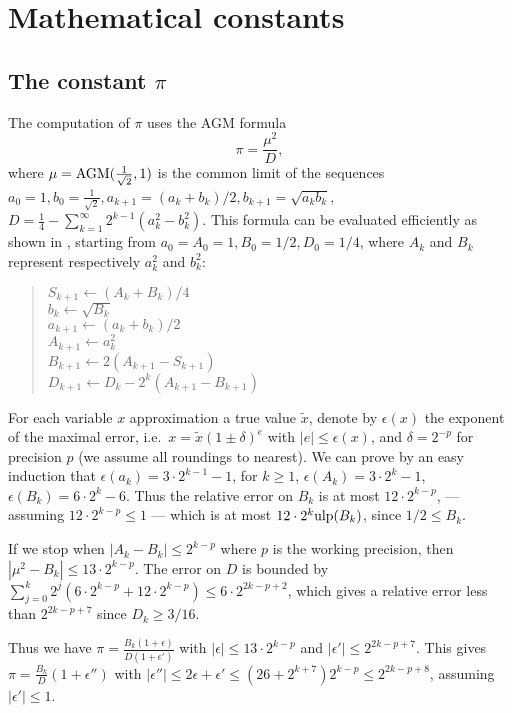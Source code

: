 \documentclass[12pt]{amsart}
\def\ulp{{\rm ulp}}
\begin{document}
\section{Mathematical constants}

\subsection{The constant $\pi$}

The computation of $\pi$ uses the AGM formula
\[ \pi = \frac{\mu^2}{D}, \]
where $\mu = {\rm AGM}(\frac{1}{\sqrt{2}}, 1)$ is the common limit
of the sequences $a_0=1, b_0 = \frac{1}{\sqrt{2}},
a_{k+1} = (a_k+b_k)/2, b_{k+1} = \sqrt{a_k b_k}$,
$D=\frac{1}{4} - \sum_{k=1}^{\infty} 2^{k-1} (a_k^2-b_k^2)$.
This formula can be evaluated efficiently as shown in \cite{ScGrVe94},
starting from $a_0 = A_0 = 1, B_0 = 1/2, D_0 = 1/4$, where $A_k$ and
$B_k$ represent respectively $a_k^2$ and $b_k^2$:
\begin{quote}
$S_{k+1} \leftarrow (A_k + B_k)/4$ \\
$b_k \leftarrow \sqrt{B_k}$ \\
$a_{k+1} \leftarrow (a_k + b_k)/2$ \\
$A_{k+1} \leftarrow a_k^2$ \\
$B_{k+1} \leftarrow 2 (A_{k+1} - S_{k+1})$ \\
$D_{k+1} \leftarrow D_k - 2^k (A_{k+1} - B_{k+1})$
\end{quote}
For each variable $x$ approximation a true value $\tilde{x}$,
denote by $\epsilon(x)$ the exponent of the maximal error,
i.e.\ $x = \tilde{x} (1\pm\delta)^e$ with $|e| \leq \epsilon(x)$,
and $\delta = 2^{-p}$ for precision $p$ (we assume all roundings to
nearest).
We can prove by an easy induction that $\epsilon(a_k) = 3 \cdot 2^{k-1} - 1$,
for $k \geq 1$, $\epsilon(A_k) = 3 \cdot 2^k - 1$,
$\epsilon(B_k) = 6 \cdot 2^k - 6$.
Thus the relative error on $B_k$ is at most $12 \cdot 2^{k-p}$,
--- assuming $12 \cdot 2^{k-p} \leq 1$ ---
which is at most $12 \cdot 2^k \ulp(B_k)$, since $1/2 \leq B_k$.

If we stop when $|A_k-B_k| \leq 2^{k-p}$ where $p$ is the working precision,
then $|\mu^2 - B_k| \leq 13 \cdot 2^{k-p}$.
The error on $D$ is bounded by $\sum_{j=0}^k 2^{j} (6 \cdot 2^{k-p} +
12 \cdot 2^{k-p}) \leq 6 \cdot 2^{2k-p+2}$, which gives a relative error less
than $2^{2k-p+7}$ since $D_k \geq 3/16$.

Thus we have $\pi = \frac{B_k (1+\epsilon)}{D (1+\epsilon')}$
with $|\epsilon| \leq 13 \cdot 2^{k-p}$ and $|\epsilon'| \leq 2^{2k-p+7}$.
This gives $\pi = \frac{B_k}{D} (1+\epsilon'')$ with
$|\epsilon''| \leq 2 \epsilon + \epsilon' \leq (26 + 2^{k+7}) 2^{k-p}
\leq 2^{2k-p+8}$, assuming $|\epsilon'| \leq 1$.
\end{document}
